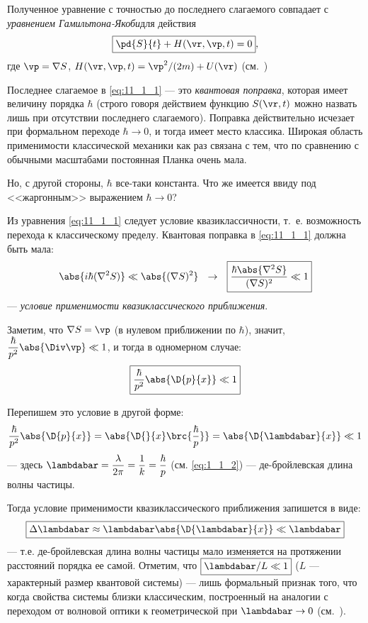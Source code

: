 Полученное уравнение с точностью до последнего слагаемого совпадает с {\em уравнением Гамильтона-Якоби}\footnotemark для действия
$$
\boxed{\pd{S}{t} + H(\vr,\vp,t) = 0},
$$
где $\vp=\nabla S$, $H(\vr,\vp,t) = {\vp^2}/{(2m)} + U(\vr)$ (см.~)

Последнее слагаемое в \eqref{eq:11_1_1} --- это {\em квантовая поправка}, которая имеет величину порядка $\hbar$ (строго говоря действием функцию $S(\vr, t)$ можно назвать лишь при отсутствии последнего слагаемого). Поправка действительно исчезает при формальном переходе $\hbar \to 0$, и тогда имеет место классика. Широкая область применимости классической механики как раз связана с тем, что по сравнению с обычными масштабами постоянная Планка очень мала.

Но, с другой стороны, $\hbar$ все-таки константа. Что же имеется ввиду под <<жаргонным>> выражением $\hbar \to 0$?

Из уравнения \eqref{eq:11_1_1} следует условие квазиклассичности, т.~е. возможность перехода к классическому пределу. Квантовая поправка в \eqref{eq:11_1_1} должна быть мала:
$$
\abs{i\hbar(\nabla^2 S)} \ll \abs{(\nabla S)^2} ~~\rightarrow~~ \boxed{\frac{\hbar \abs{\nabla^2 S}}{(\nabla S)^2} \ll 1} 
$$
--- {\em условие применимости квазиклассического приближения}.

Заметим, что $\nabla S =\vp$ (в нулевом приближении по $\hbar$), значит, ${\dfrac{\hbar}{p^2}\abs{\Div \vp} \ll 1}$, и тогда в одномерном случае:
$$
\boxed{\frac{\hbar}{p^2}\abs{\D{p}{x}} \ll 1}
$$

Перепишем это условие в другой форме:
$$
\frac{\hbar}{p^2} \abs{\D{p}{x}} = 
\abs{\D{}{x}\brc{\frac{\hbar}{p}}} = \abs{\D{\lambdabar}{x}} \ll 1
$$
--- здесь $\lambdabar = \dfrac{\lambda}{2\pi} = \dfrac{1}{k} = \dfrac{\hbar}{p}$ (см. \eqref{eq:1_1_2}) --- де-бройлевская длина волны частицы.

Тогда условие применимости квазиклассического приближения запишется в виде:
$$
\boxed{\Delta \lambdabar \approx \lambdabar \abs{\D{\lambdabar}{x}} \ll \lambdabar}
$$
--- т.е. де-бройлевская длина волны частицы мало изменяется на протяжении расстояний порядка ее самой. Отметим, что $\boxed{\lambdabar/L \ll 1}$ ($L$ --- характерный размер квантовой системы) --- лишь формальный признак того, что когда свойства системы близки  классическим, построенный на аналогии с переходом от волновой оптики к геометрической при $\lambdabar \to 0$ (см.~).

